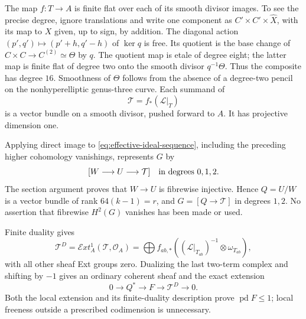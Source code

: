 \documentclass[11pt]{article}
\theoremstyle{definition}
\theoremstyle{remark}
\begin{document}
The map $f:T\to A$ is finite flat over each of its smooth divisor
images. To see the precise degree, ignore translations and write
one component as $C'\times C'\times\widehat X$, with its map to
$X$ given, up to sign, by addition. The diagonal action
$(p',q')\mapsto(p'+h,q'-h)$ of $\ker q$ is free. Its quotient is
the base change of $C\times C\to C^{(2)}\simeq\Theta$ by $q$.
The quotient map is etale of degree eight; the latter map is
finite flat of degree two onto the smooth divisor $q^{-1}\Theta$.
Thus the composite has degree $16$. Smoothness of $\Theta$ follows
from the absence of a degree-two pencil on the nonhyperelliptic
genus-three curve. Each summand of
\[
 \mathcal T=f_*(\mathcal L|_T)
\]
is a vector bundle on a smooth divisor, pushed forward to $A$.
It has projective dimension one.

Applying direct image to \eqref{eq:effective-ideal-sequence}, including the preceding higher
cohomology vanishings, represents $G$ by
\begin{equation}\label{eq:effective-three-terms}
 [W\longrightarrow U\longrightarrow\mathcal T]
 \quad\hbox{in degrees }0,1,2.                            
\end{equation}
The section argument proves that $W\to U$ is fibrewise injective.
Hence $Q=U/W$ is a vector bundle of rank $64(k-1)=r$, and
$G=[Q\to\mathcal T]$ in degrees $1,2$. No assertion that fibrewise
$H^2(G)$ vanishes has been made or used.

Finite duality gives
\[
 \mathcal T^D=\mathcal E xt^1_A(\mathcal T,\mathcal O_A)
 =\bigoplus f_{ab,*}
       ((\mathcal L|_{T_{ab}})^{-1}\otimes\omega_{T_{ab}}),
\]
with all other sheaf Ext groups zero. Dualizing the last two-term
complex and shifting by $-1$ gives an ordinary coherent sheaf and
the exact extension
\begin{equation}\label{eq:effective-extension}
 0\longrightarrow Q^*\longrightarrow F
   \longrightarrow\mathcal T^D\longrightarrow0.          
\end{equation}
Both the local extension and its finite-duality description prove
$\operatorname{pd}F\le1$; local freeness outside a prescribed
codimension is unnecessary.
\end{document}
